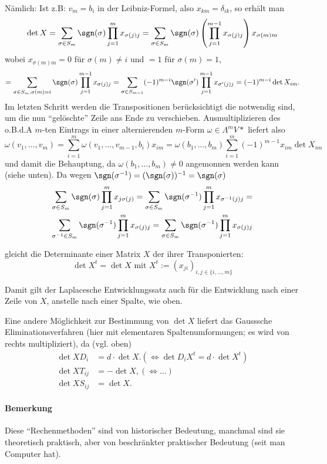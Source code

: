 	Nämlich: Ist z.B: $ v_m=b_i $ in der Leibniz-Formel, also $ x_{km}=\delta_{ik} $, so erhält man
		\[ \det X = \sum_{\sigma\in S_m}\sgn(\sigma)\prod_{j=1}^{m}x_{\sigma(j)j}=\sum_{\sigma\in S_m}\sgn(\sigma)\left(\prod_{j=1}^{m-1}x_{\sigma(j)j}\right)x_{\sigma(m)m} \]
	wobei $ x_{\sigma(m)m} = 0 $ für $ \sigma(m)\neq i $ und $ =1 $ für $ \sigma(m) = 1 $,
		\[ = \sum_{\sigma\in S_m, \sigma(m)=i}\sgn(\sigma)\prod_{j=1}^{m-1}x_{\sigma(j)j} = \sum_{\sigma\in S_{m-1}}(-1)^{m-i}\sgn(\sigma')\prod_{j=1}^{m-1}x_{\sigma'(j)j} = (-1)^{m-i}\det X_{im}. \]
	Im letzten Schritt werden die Transpositionen berücksichtigt die notwendig sind, um die nun "`gelöschte"' Zeile ans Ende zu verschieben. Ausmultiplizieren des o.B.d.A $ m $-ten Eintrags in einer alternierenden $ m $-Form $ \omega\in \Lambda^mV* $ liefert also 
		\[ \omega(v_1,\dots,v_m) = \sum_{i=1}^{m}\omega(v_1,\dots,v_{m-1},b_i)x_{im} = \omega(b_1,\dots,b_m)\sum_{i=1}^{m}(-1)^{m-1}x_{im}\det X_{im} \]
	und damit die Behauptung, da $ \omega(b_1,\dots,b_m)\neq 0 $ angemonnen werden kann (siehe unten).
	Da wegen $ \sgn(\sigma^{-1})=(\sgn(\sigma))^{-1} = \sgn(\sigma) $
		\begin{gather*}
		\sum_{\sigma\in S_m}\sgn(\sigma)\prod_{j=1}^{m}x_{j\sigma(j)} =
		\sum_{\sigma\in S_m} \sgn(\sigma^{-1})\prod_{j=1}^{m}x_{\sigma^{-1}(j)j} =\\
		\sum_{\sigma^{-1}\in S_m} \sgn(\sigma^{-1})\prod_{j=1}^{m}x_{\sigma(j)j} =
		\sum_{\sigma\in S_m} \sgn(\sigma^{-1})\prod_{j=1}^{m}x_{\sigma(j)j}
		\end{gather*}
	\begin{Definition}
		gleicht die Determinante einer Matrix $ X $ der ihrer Transponierten:
		\[ \det X^t = \det X \text{ mit } X^t := (x_{ji})_{i,j\in \{i,\dots, m \}} \]
	\end{Definition}
	Damit gilt der Laplacesche Entwicklungssatz auch für die Entwicklung nach einer Zeile von $ X $, anstelle nach einer Spalte, wie oben.
	
	Eine andere Möglichkeit zur Bestimmung von $ \det X $ liefert das Gausssche Eliminationsverfahren (hier mit elementaren Spaltenumformungen; es wird von rechts multipliziert), da (vgl. oben)
		\begin{align*}
		\det XD_i &= d\cdot \det X. (\Leftrightarrow \det D_iX^t = d\cdot \det X^t)\\
		\det XT_{ij} &= -\det X, (\Leftrightarrow\dots)\\
		\det XS_{ij} &= \det X.
		\end{align*}
\paragraph{Bemerkung}
	Diese "`Rechenmethoden"' sind von historischer Bedeutung, manchmal sind sie theoretisch praktisch, aber von beschränkter praktischer Bedeutung (seit man Computer hat).
